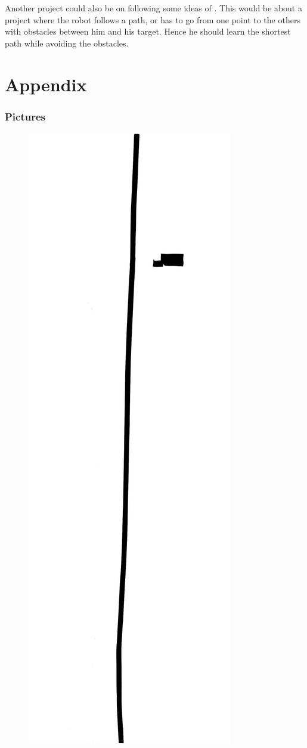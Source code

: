 \documentclass[14pt,a4paper]{article}
\let\oldpart\part
\renewcommand\part{\newpage\oldpart}
\theoremstyle{definition}
\begin{document}
Another project could also be on following some ideas of \citep{Xia2015}. This would be about a project where the robot follows a path, or has to go from one point to the others with obstacles between him and his target. Hence he should learn the shortest path while avoiding the obstacles.



\newpage
\part{Appendix}
\appendix
\section{Pictures} \label{pictures}

\begin{figure}[h]
\centering
\captionsetup{justification=centering,margin=2cm}
\includegraphics[scale=0.3]{img/setting.pdf}

\end{figure}
\end{document}
